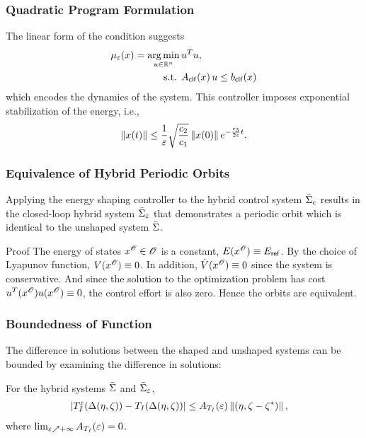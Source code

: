 \begin{frame}[t]
  \frametitle{Quadratic Program Formulation}
  The linear form of the \RESCLF condition suggests
  \begin{align*}
    \mu_{\varepsilon}(x) = \operatorname*{arg\,min}_{u \in \mathbb{R}^{n}}  \, & u^T u,\\
    \mbox{s.t. } & A_{\mathsf{clf}}(x) \, u \leq b_{\mathsf{clf}}(x)
  \end{align*}
  which encodes the dynamics of the system. This controller imposes exponential
  stabilization of the energy, i.e.,
  \begin{align*}
    \left\|x(t)\right\| \leq \frac{1}{\varepsilon}
    \sqrt{\frac{c_{2}}{c_{1}}} \left\|x(0)\right\| e^{-\frac{c_{3}}{2\varepsilon} t}.
  \end{align*}
\end{frame}

\begin{frame}[t]
  \frametitle{Equivalence of Hybrid Periodic Orbits}
  \begin{lemma}
    Applying the energy shaping controller to the hybrid control system $\bar{\Sigma}_{c}$
    results in the closed-loop hybrid system $\bar{\Sigma}_{\varepsilon}$ that demonstrates a
    periodic orbit which is identical to the unshaped system $\bar{\Sigma}$.
  \end{lemma}
  \begin{block}{Proof}
    The energy of states $x^{\mathscr{O}} \in \mathscr{O}$ is a constant,
    $E(x^{\mathscr{O}}) \equiv E_{\mathsf{ref}}$. By the choice of Lyapunov function,
    $V(x^{\mathscr{O}}) \equiv 0$. In addition, ${\dot {V}}(x^{\mathscr{O}}) \equiv 0$ since
    the system is conservative. And since the solution to the optimization
    problem has cost $u^{T}(x^{\mathscr{O}}) u(x^{\mathscr{O}}) \equiv 0$, the
    control effort is also zero. Hence the orbits are equivalent.
  \end{block}
\end{frame}

\begin{frame}[t]
  \frametitle{Boundedness of \TtI{} Function}
  The difference in solutions between the shaped and unshaped systems can be
  bounded by examining the difference in solutions:
  \begin{lemma}
    For the hybrid systems $\bar{\Sigma}$ and $\bar{\Sigma}_{\varepsilon}$,
    \begin{eqnarray}
      \nonumber
      &| T_{I}^{\varepsilon}(\Delta(\eta, \zeta)) - T_{I}(\Delta(\eta, \zeta)) | \leq A_{T_{I}}(\varepsilon) \left\|(\eta, \zeta - \zeta^{*})\right\|,
    \end{eqnarray}
    where $\lim_{\varepsilon \nearrow +\infty} A_{T_{I}}(\varepsilon) = 0$.
  \end{lemma}
\end{frame}


